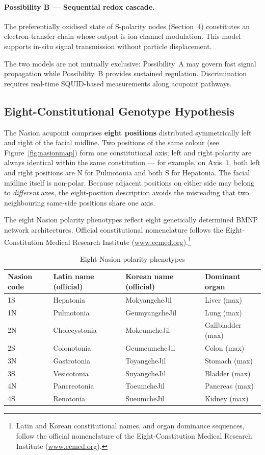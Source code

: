 \documentclass[12pt,a4paper]{article}
\begin{document}
\paragraph{Possibility B --- Sequential redox cascade.}
The preferentially oxidised state of S-polarity nodes (Section~4)
constitutes an electron-transfer chain whose output is ion-channel
modulation.  This model supports in-situ signal transmission without
particle displacement.

The two models are not mutually exclusive: Possibility~A may govern
fast signal propagation while Possibility~B provides sustained
regulation.  Discrimination requires real-time SQUID-based measurements
along acupoint pathways.

\subsection{Eight-Constitutional Genotype Hypothesis}
The Nasion acupoint comprises \textbf{eight positions} distributed
symmetrically left and right of the facial midline.
Two positions of the same colour (see Figure~\ref{fig:nasionmap})
form one constitutional axis; left and right polarity are always
identical within the same constitution --- for example, on Axis~1,
both left and right positions are N for Pulmotonia and both S for
Hepatonia.  The facial midline itself is non-polar.
Because adjacent positions on either side may belong to \emph{different}
axes, the eight-position description avoids the misreading that two
neighbouring same-side positions share one axis.

The eight Nasion polarity phenotypes reflect eight genetically determined
BMNP network architectures.  Official constitutional nomenclature follows
the Eight-Constitution Medical Research Institute
(\url{www.ecmed.org}).\footnote{%
  Latin and Korean constitutional names, and organ dominance sequences,
  follow the official nomenclature of the Eight-Constitution Medical
  Research Institute (\url{www.ecmed.org}).}

\begin{table}[h]
\centering
\caption{Eight Nasion polarity phenotypes}
\begin{tabular}{llll}
\toprule
Nasion code & Latin name (official) & Korean name (official) &
  Dominant organ \\
\midrule
1S & Hepatonia   & MokyangcheJil & Liver (max) \\
1N & Pulmotonia  & GeumyangcheJil & Lung (max) \\
2N & Cholecystonia & MokeumcheJil & Gallbladder (max) \\
2S & Colonotonia & GeumeumcheJil & Colon (max) \\
3N & Gastrotonia & ToyangcheJil & Stomach (max) \\
3S & Vesicotonia & SuyangcheJil & Bladder (max) \\
4N & Pancreotonia & ToeumcheJil & Pancreas (max) \\
4S & Renotonia   & SueumcheJil & Kidney (max) \\
\bottomrule
\end{tabular}
\end{table}
\end{document}

